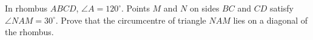 In rhombus $ABCD$, $\angle A=120^\circ$. Points $M$ and $N$ on sides $BC$ and $CD$ satisfy $\angle NAM=30^\circ$. Prove that the circumcentre of triangle $NAM$ lies on a diagonal of the rhombus.
